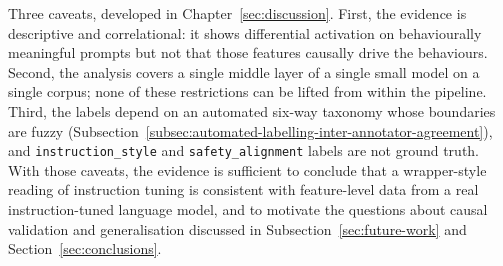 Three caveats, developed in Chapter~\ref{sec:discussion}. First, the evidence is descriptive and correlational: it shows differential activation on behaviourally meaningful prompts but not that those features causally drive the behaviours. Second, the analysis covers a single middle layer of a single small model on a single corpus; none of these restrictions can be lifted from within the pipeline. Third, the labels depend on an automated six-way taxonomy whose boundaries are fuzzy (Subsection~\ref{subsec:automated-labelling-inter-annotator-agreement}), and \texttt{instruction\_style} and \texttt{safety\_alignment} labels are not ground truth. With those caveats, the evidence is sufficient to conclude that a wrapper-style reading of instruction tuning is consistent with feature-level data from a real instruction-tuned language model, and to motivate the questions about causal validation and generalisation discussed in Subsection~\ref{sec:future-work} and Section~\ref{sec:conclusions}.
